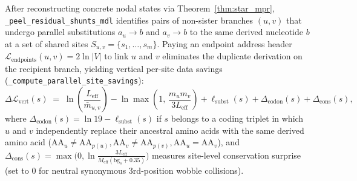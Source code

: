 \documentclass[11pt,a4paper]{article}
\begin{document}
After reconstructing concrete nodal states via Theorem~\ref{thm:star_mpr}, \texttt{\_peel\_residual\_shunts\_mdl} identifies pairs of non-sister branches $(u,v)$ that undergo parallel substitutions $a_u \to b$ and $a_v \to b$ to the same derived nucleotide $b$ at a set of shared sites $S_{u,v} = \{s_1, \dots, s_m\}$. Paying an endpoint address header $\mathcal{L}_{\text{endpoints}}(u,v) = 2\ln|V|$ to link $u$ and $v$ eliminates the duplicate derivation on the recipient branch, yielding vertical per-site data savings (\texttt{\_compute\_parallel\_site\_savings}):
\begin{equation}
    \Delta\mathcal{L}_{\text{vert}}(s) \;=\; \ln\!\left(\frac{L_{\text{eff}}}{\bar{m}_{u,v}}\right) - \ln\max\!\left(1,\, \frac{m_u m_v}{3 L_{\text{eff}}}\right) + \ell_{\text{subst}}(s) + \Delta_{\text{codon}}(s) + \Delta_{\text{cons}}(s),
    \label{eq:shunt_vert_sav}
\end{equation}
where $\Delta_{\text{codon}}(s) = \ln 19 - \ell_{\text{subst}}(s)$ if $s$ belongs to a coding triplet in which $u$ and $v$ independently replace their ancestral amino acids with the same derived amino acid ($\text{AA}_u \neq \text{AA}_{p(u)}, \text{AA}_v \neq \text{AA}_{p(v)}, \text{AA}_u = \text{AA}_v$), and $\Delta_{\text{cons}}(s) = \max\big(0, \ln\frac{3 L_{\text{eff}}}{M_{\text{eff}}(\text{bg}_s + 0.35)}\big)$ measures site-level conservation surprise (set to $0$ for neutral synonymous 3rd-position wobble collisions).
\end{document}
